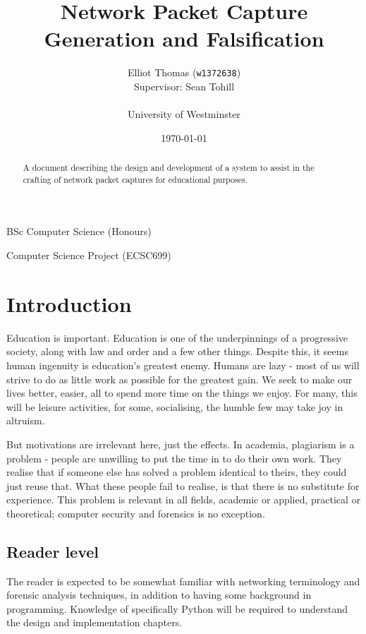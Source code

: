 \documentclass[10pt,a4paper,notitlepage,twoside]{report}
\author{Elliot Thomas (\texttt{w1372638})\\ \small Supervisor: Sean Tohill\\ \\ University of Westminster}
\title{Network Packet Capture Generation and Falsification}
\date{\today}
\begin{document}
\maketitle
\begin{center}
BSc Computer Science (Honours)

Computer Science Project (ECSC699)
\end{center}
\begin{abstract}
\begin{center}
A document describing the design and development of a system to assist in the crafting of network packet captures for educational purposes.
\end{center}
\end{abstract}
\pagebreak
\listoffigures
\lstlistoflistings
\tableofcontents

\chapter{Introduction}
Education is important. Education is one of the underpinnings of a progressive society, along with law and order and a few other things.
Despite this, it seems human ingenuity is education's greatest enemy. Humans are lazy - most of us will strive to do as little work as possible for the greatest gain.
We seek to make our lives better, easier, all to spend more time on the things we enjoy. For many, this will be leisure activities, for some, socialising, the humble few may take joy in altruism.

But motivations are irrelevant here, just the effects.
In academia, plagiarism is a problem - people are unwilling to put the time in to do their own work. They realise that if someone else has solved a problem identical to theirs, they could just reuse that.
What these people fail to realise, is that there is no substitute for experience. This problem is relevant in all fields, academic or applied, practical or theoretical; computer security and forensics is no exception.

\section{Reader level}
The reader is expected to be somewhat familiar with networking terminology and forensic analysis techniques, in addition to having some background in programming. Knowledge of specifically Python will be required to understand the design and implementation chapters.
\end{document}
